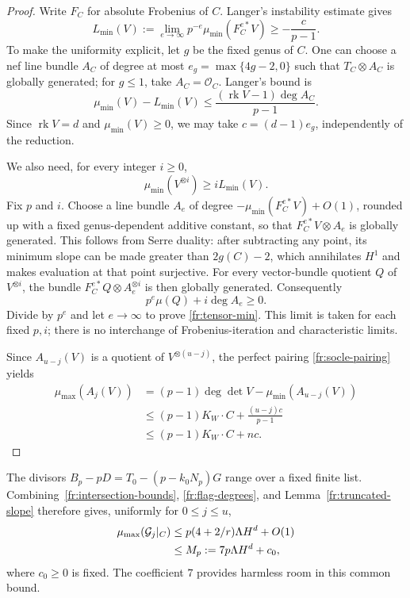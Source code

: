 \documentclass[12pt,a4paper,psamsfonts]{amsart}
\theoremstyle{definition}
\theoremstyle{plain}
\newcommand{\OO}{\mathcal O}
\DeclareMathOperator{\rk}{rk}
\begin{document}
\begin{proof}
Write $F_C$ for absolute Frobenius of $C$.  Langer's instability
estimate \cite[Corollary~2.5]{Langer} gives
\begin{equation}\label{fr:Langer-min}
 L_{\min}(V):=
 \lim_{e\to\infty}p^{-e}\mu_{\min}(F_C^{e*}V)
 \ge-\frac{c}{p-1}.
\end{equation}
To make the uniformity explicit, let $g$ be the fixed genus of $C$.
One can choose a nef line bundle $A_C$ of degree at most
$e_g=\max\{4g-2,0\}$ such that $T_C\otimes A_C$ is globally
generated; for $g\le1$, take $A_C=\OO_C$. Langer's bound is
\[
 \mu_{\min}(V)-L_{\min}(V)
 \le\frac{(\rk V-1)\deg A_C}{p-1}.
\]
Since $\rk V=d$ and $\mu_{\min}(V)\ge0$, we may take
$c=(d-1)e_g$, independently of the reduction.

We also need, for every integer $i\ge0$,
\begin{equation}\label{fr:tensor-min}
 \mu_{\min}(V^{\otimes i})\ge iL_{\min}(V).
\end{equation}
Fix $p$ and $i$.  Choose a line bundle $A_e$ of degree
$-\mu_{\min}(F_C^{e*}V)+O(1)$, rounded up with a fixed
genus-dependent additive constant, so that
$F_C^{e*}V\otimes A_e$ is globally generated.  This follows from
Serre duality: after subtracting any point, its minimum slope can
be made greater than $2g(C)-2$, which annihilates $H^1$ and makes
evaluation at that point surjective.  For every vector-bundle
quotient $Q$ of $V^{\otimes i}$, the bundle
$F_C^{e*}Q\otimes A_e^{\otimes i}$ is then globally generated.
Consequently
\[
 p^e\mu(Q)+i\deg A_e\ge0.
\]
Divide by $p^e$ and let $e\to\infty$ to prove
\eqref{fr:tensor-min}.  This limit is taken for each fixed $p,i$;
there is no interchange of Frobenius-iteration and characteristic
limits.

Since $A_{u-j}(V)$ is a quotient of $V^{\otimes(u-j)}$, the perfect
pairing \eqref{fr:socle-pairing} yields
\begin{align*}
 \mu_{\max}(A_j(V))
 &= (p-1)\deg\det V-\mu_{\min}(A_{u-j}(V))\\
 &\le(p-1)K_W\cdot C+\frac{(u-j)c}{p-1}\\
 &\le(p-1)K_W\cdot C+nc.
\end{align*}
\end{proof}

The divisors $B_p-pD=T_0-(p-k_0N_p)G$ range over a fixed finite
list. Combining~\eqref{fr:intersection-bounds},
\eqref{fr:flag-degrees}, and Lemma~\ref{fr:truncated-slope}
therefore gives, uniformly for $0\le j\le u$,
\begin{align}
 \mu_{\max}(\mathcal G_j|_C)
 &\le p(4+2/r)\Lambda H^d+O(1)\notag\\
 &\le M_p:=7p\Lambda H^d+c_0,\label{fr:common-slope-bound}
\end{align}
where $c_0\ge0$ is fixed.  The coefficient $7$ provides harmless
room in this common bound.
\end{document}
